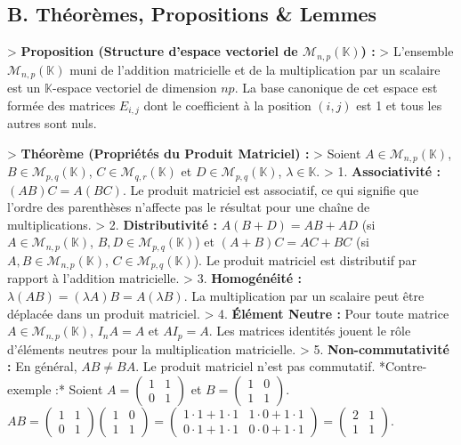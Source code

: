 \documentclass[12pt,a4paper]{report}
\begin{document}
\subsection{B. Théorèmes, Propositions & Lemmes}

> \textbf{Proposition (Structure d'espace vectoriel de $\mathcal{M}_{n,p}(\mathbb{K})$) :}
> L'ensemble $\mathcal{M}_{n,p}(\mathbb{K})$ muni de l'addition matricielle et de la multiplication par un scalaire est un $\mathbb{K}$-espace vectoriel de dimension $np$. La base canonique de cet espace est formée des matrices $E_{i,j}$ dont le coefficient à la position $(i,j)$ est 1 et tous les autres sont nuls.

> \textbf{Théorème (Propriétés du Produit Matriciel) :}
> Soient $A \in \mathcal{M}_{n,p}(\mathbb{K})$, $B \in \mathcal{M}_{p,q}(\mathbb{K})$, $C \in \mathcal{M}_{q,r}(\mathbb{K})$ et $D \in \mathcal{M}_{p,q}(\mathbb{K})$, $\lambda \in \mathbb{K}$.
> 1.  \textbf{Associativité :} $(AB)C = A(BC)$. Le produit matriciel est associatif, ce qui signifie que l'ordre des parenthèses n'affecte pas le résultat pour une chaîne de multiplications.
> 2.  \textbf{Distributivité :} $A(B+D) = AB + AD$ (si $A \in \mathcal{M}_{n,p}(\mathbb{K})$, $B, D \in \mathcal{M}_{p,q}(\mathbb{K})$) et $(A+B)C = AC + BC$ (si $A, B \in \mathcal{M}_{n,p}(\mathbb{K})$, $C \in \mathcal{M}_{p,q}(\mathbb{K})$). Le produit matriciel est distributif par rapport à l'addition matricielle.
> 3.  \textbf{Homogénéité :} $\lambda(AB) = (\lambda A)B = A(\lambda B)$. La multiplication par un scalaire peut être déplacée dans un produit matriciel.
> 4.  \textbf{Élément Neutre :} Pour toute matrice $A \in \mathcal{M}_{n,p}(\mathbb{K})$, $I_n A = A$ et $A I_p = A$. Les matrices identités jouent le rôle d'éléments neutres pour la multiplication matricielle.
> 5.  \textbf{Non-commutativité :} En général, $AB \neq BA$. Le produit matriciel n'est pas commutatif.
    *Contre-exemple :* Soient $A = \begin{pmatrix} 1 & 1 \\ 0 & 1 \end{pmatrix}$ et $B = \begin{pmatrix} 1 & 0 \\ 1 & 1 \end{pmatrix}$.
    $AB = \begin{pmatrix} 1 & 1 \\ 0 & 1 \end{pmatrix} \begin{pmatrix} 1 & 0 \\ 1 & 1 \end{pmatrix} = \begin{pmatrix} 1 \cdot 1 + 1 \cdot 1 & 1 \cdot 0 + 1 \cdot 1 \\ 0 \cdot 1 + 1 \cdot 1 & 0 \cdot 0 + 1 \cdot 1 \end{pmatrix} = \begin{pmatrix} 2 & 1 \\ 1 & 1 \end{pmatrix}$.
\end{document}
